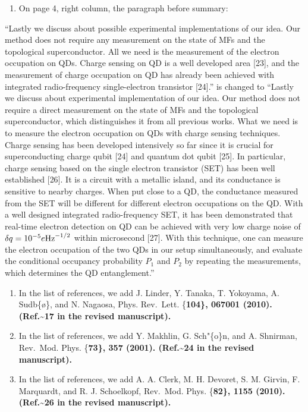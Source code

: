 \documentclass[11pt]{article}
\providecommand{\tightlist}{%
      \setlength{\itemsep}{0pt}\setlength{\parskip}{0pt}}
\begin{document}
\begin{enumerate}
\def\labelenumi{(\arabic{enumi})}
\setcounter{enumi}{3}
\tightlist
\item
  On page 4, right column, the paragraph before summary:
\end{enumerate}

``Lastly we discuss about possible experimental implementations of our
idea. Our method does not require any measurement on the state of MFs
and the topological superconductor. All we need is the measurement of
the electron occupation on QDs. Charge sensing on QD is a well developed
area {[}23{]}, and the measurement of charge occupation on QD has
already been achieved with integrated radio-frequency single-electron
transistor {[}24{]}.'' is changed to ``Lastly we discuss about
experimental implementation of our idea. Our method does not require a
direct measurement on the state of MFs and the topological
superconductor, which distinguishes it from all previous works. What we
need is to measure the electron occupation on QDs with charge sensing
techniques. Charge sensing has been developed intensively so far since
it is crucial for superconducting charge qubit {[}24{]} and quantum dot
qubit {[}25{]}. In particular, charge sensing based on the single
electron transistor (SET) has been well established {[}26{]}. It is a
circuit with a metallic island, and its conductance is sensitive to
nearby charges. When put close to a QD, the conductance measured from
the SET will be different for different electron occupations on the QD.
With a well designed integrated radio-frequency SET, it has been
demonstrated that real-time electron detection on QD can be achieved
with very low charge noise of
\(\delta q= 10^{-5} e {\rm Hz}^{\rm -1/2}\) within microsecond {[}27{]}.
With this technique, one can measure the electron occupation of the two
QDs in our setup simultaneously, and evaluate the conditional occupancy
probability \(P_1\) and \(P_2\) by repeating the measurements, which
determines the QD entanglement.''

\begin{enumerate}
\def\labelenumi{(\arabic{enumi})}
\setcounter{enumi}{4}
\item
  In the list of references, we add J. Linder, Y. Tanaka, T. Yokoyama,
  A. Sudb\{\o\}, and N. Nagaosa, Phys. Rev.~Lett. \{\bf 104\}, 067001
  (2010). (Ref.\textasciitilde{}17 in the revised manuscript).
  \vspace{5mm}
\item
  In the list of references, we add Y. Makhlin, G. Sch"\{o\}n, and A.
  Shnirman, Rev.~Mod. Phys. \{\bf 73\}, 357 (2001).
  (Ref.\textasciitilde{}24 in the revised manuscript).
\item
  In the list of references, we add A. A. Clerk, M. H. Devoret, S. M.
  Girvin, F. Marquardt, and R. J. Schoelkopf, Rev.~Mod. Phys.
  \{\bf 82\}, 1155 (2010). (Ref.\textasciitilde{}26 in the revised
  manuscript).
\end{enumerate}
\end{document}

